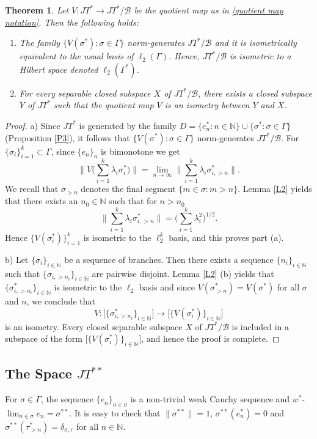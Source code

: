 \documentclass[12pt]{amsart}
\theoremstyle{plain}
\numberwithin{equation}{section}
\newcommand{\N}{\mathbb{N}}
\newcommand{\B}{\mathcal{B}}
\newtheorem{theorem}{Theorem}[section]
\begin{document}
\begin{theorem}\label{P2}
Let $V: JT^* \to JT^*/\B$ be the quotient map as in \eqref{quotient map notation}. Then the following holds:
\begin{enumerate}
    \item[a)] The family $\{V(\sigma^*): \sigma \in \Gamma\}$ norm-generates $JT^*/\B$ and it is isometrically equivalent to the usual basis of $\ell_2(\Gamma)$. Hence, $JT^*/\B$ is isometric to a Hilbert space denoted $\ell_2(\Gamma^*)$.
    \item[b)] For every separable closed subspace $X$ of $JT^*/\B$, there exists a closed subspace $Y$ of $JT^*$ such that the quotient map $V$ is an isometry between $Y$ and $X$.
\end{enumerate}
\end{theorem}
\begin{proof}
a) Since $JT^*$ is generated by the family $D = \{ e_n^* :n\in \N\} \cup \{ \sigma^*: \sigma \in \Gamma\}$ (Proposition \ref{P3}), it follows that $\{V(\sigma^*): \sigma \in \Gamma\}$ norm-generates $JT^*/\B$. For $\{\sigma_i\}_{i=1}^k \subset \Gamma$, since $\{e_n\}_n$ is bimonotone we get
\[\Big\| V\Big( \sum_{i=1}^k \lambda_i \sigma_i^* \Big) \Big\| = \lim_{n\to \infty} \Big\| \sum_{i=1}^k \lambda_i \sigma_{i,>n}^* \Big\|. \]
We recall that $\sigma_{>n}$ denotes the final segment $\{m\in \sigma : m>n\}$. Lemma \ref{L2} yields that there exists an $n_0 \in \N$ such that for $n > n_0$
\[ \Big\| \sum_{i=1}^k \lambda_i \sigma_{i,>n}^* \Big\| =\Big( \sum_{i=1}^k \lambda_i^2 \Big)^{1/2}. \]
Hence $\{V(\sigma_i^*)\}_{i=1}^k$ is isometric to the $\ell_2^k$ basis, and this proves part (a).

b) Let $\{\sigma_i\}_{i\in \N}$ be a sequence of branches. Then there exists a sequence $\{n_i\}_{i\in \N}$ such that $\{\sigma_{i, >n_i}\}_{i\in \N}$ are pairwise disjoint. Lemma \ref{L2} (b) yields that $\{\sigma_{i, >n_i}^*\}_{i\in \N}$ is isometric to the $\ell_2$ basis and since $V(\sigma_{>n}^*) = V(\sigma^*)$ for all $\sigma$ and $n$, we conclude that
\[ V: \Big[ \{\sigma^*_{i, >n_i}\}_{i\in \N} \Big] \to \Big[ \{V(\sigma_{i}^*)\}_{i\in \N} \Big] \]
is an isometry. Every closed separable subspace $X$ of $JT^*/\B$ is included in a subspace of the form $\big[\{V(\sigma_i^*)\}_{i\in \N}\big]$, and hence the proof is complete.
\end{proof}

\subsection{The Space $JT^{**}$}
For $\sigma \in \Gamma$, the sequence $\{e_n\}_{n\in\sigma}$ is a non-trivial weak Cauchy sequence and $w^*$-$\lim_{n\in \sigma} e_n = \sigma^{**}$. It is easy to check that $\|\sigma^{**}\| = 1$, $\sigma^{**}(e_n^*) = 0$ and $\sigma^{**}(\tau_{>n}^*) = \delta_{\sigma, \tau}$ for all $n \in \N$.
\end{document}
